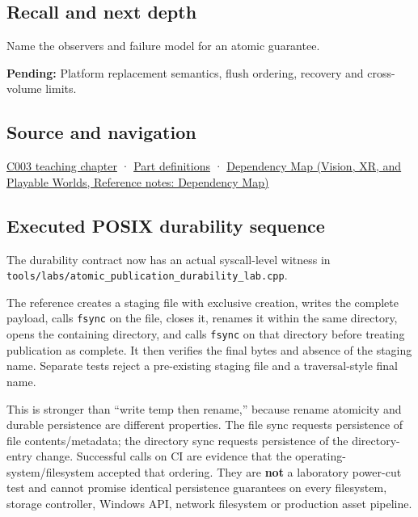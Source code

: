 \subsection{Recall and next depth}\label{appendix-e89a8f290ef5-recall-and-next-depth}

Name the observers and failure model for an atomic guarantee.

\textbf{Pending:} Platform replacement semantics, flush ordering, recovery and cross-volume limits.

\subsection{Source and navigation}\label{appendix-e89a8f290ef5-source-and-navigation}

\hyperref[01-foundations-i-ch002-where-the-bytes-live]{C003 teaching chapter} · \hyperref[appendix-fd090d982a15-m003---parts-41-60]{Part definitions} · \href{../07-Vision-XR-and-Playable-Worlds/main.pdf\#nameddest=appendix-4ad47bdd269a}{Dependency Map (Vision, XR, and Playable Worlds, Reference notes: Dependency Map)}

\subsection{Executed POSIX durability sequence}\label{appendix-e89a8f290ef5-executed-posix-durability-sequence}

The durability contract now has an actual syscall-level witness in \texttt{tools/labs/atomic\_publication\_durability\_lab.cpp}.

The reference creates a staging file with exclusive creation, writes the complete payload, calls \texttt{fsync} on the file, closes it, renames it within the same directory, opens the containing directory, and calls \texttt{fsync} on that directory before treating publication as complete. It then verifies the final bytes and absence of the staging name. Separate tests reject a pre-existing staging file and a traversal-style final name.

This is stronger than ``write temp then rename,'' because rename atomicity and durable persistence are different properties. The file sync requests persistence of file contents/metadata; the directory sync requests persistence of the directory-entry change. Successful calls on CI are evidence that the operating-system/filesystem accepted that ordering. They are \textbf{not} a laboratory power-cut test and cannot promise identical persistence guarantees on every filesystem, storage controller, Windows API, network filesystem or production asset pipeline.
